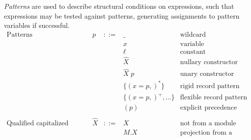 \documentclass{article}
\begin{document}
\emph{Patterns} are used to describe structural conditions on expressions, such that expressions may be tested against patterns, generating assignments to pattern variables if successful.
$$\begin{array}{rrcll}
  \textrm{Patterns} & p &::=& \_ & \textrm{wildcard} \\
  &&& x & \textrm{variable} \\
  &&& \ell & \textrm{constant} \\
  &&& \hat{X} & \textrm{nullary constructor} \\
  &&& \hat{X} \; p & \textrm{unary constructor} \\
  &&& \{(x = p,)^*\} & \textrm{rigid record pattern} \\
  &&& \{(x = p,)^+, \ldots\} & \textrm{flexible record pattern} \\
  &&& (p) & \textrm{explicit precedence} \\
  \\
  \textrm{Qualified capitalized variables} & \hat{X} &::=& X & \textrm{not from a module} \\
  &&& M.X & \textrm{projection from a module} \\
\end{array}$$
\end{document}
